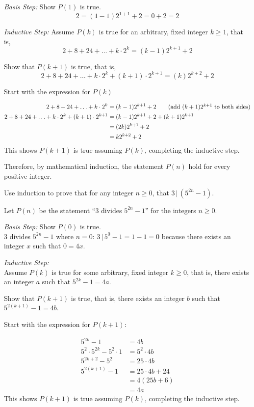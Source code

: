 \begin{questions}
\begin{solution}
  \textit{Basis Step:}  Show $P(1)$ is true.  
  \[ 2 = (1-1)2^{1+1} + 2 = 0 + 2 = 2  \]

  \textit{Inductive Step:}  Assume $P(k)$ is true for an arbitrary, fixed integer $k \geq 1$, that is, 
    \[ 2 + 8 + 24 + \ldots + k\cdot 2^k = (k-1)2^{k+1} + 2 \]

  Show that $P(k+1)$ is true, that is, 
    \[ 2 + 8 + 24 + \ldots + k\cdot 2^k  + (k+1)\cdot 2^{k+1} = (k)2^{k+2} + 2   \]

  Start with the expression for $P(k)$ 

  \begin{align*}
    2 + 8 + 24 + \ldots + k\cdot 2^k &=  (k-1)2^{k+1} + 2 \tag{add $(k+1)2^{k+1}$ to both sides} \\
    2 + 8 + 24 + \ldots + k\cdot 2^k  + (k+1)\cdot 2^{k+1}  &=  (k-1)2^{k+1} + 2 + (k+1)2^{k+1}  \\
     &= (2k)2^{k+1} + 2 \\
     &= k2^{k+2} + 2 
  \end{align*}
  This shows $P(k+1)$ is true assuming $P(k)$, completing the inductive step.

  Therefore, by mathematical induction, the statement $P(n)$ hold for every positive integer.
\end{solution}


\newpage
{} Use induction to prove that for any integer $n \geq 0$, that $3 \,|\, (5^{2n} -1)$.
  
\begin{solution}
  Let $P(n)$ be the statement ``3 divides $5^{2n} - 1$'' for the integers $n \geq 0$. 

  \textit{Basis Step:} Show $P(0)$ is true.  \\
    3 divides $5^{2n} -1$ where $n=0$: $3 \,|\, 5^{0} - 1 = 1 - 1 = 0$ because there exists an integer $x$ such that $0 = 4x$. 

  \textit{Inductive Step:} \\
  Assume $P(k)$ is true for some arbitrary, fixed integer $k \geq 0$, that is, there exists an integer $a$ such that $5^{2k} - 1 = 4a$. 

  Show that $P(k+1)$ is true, that is, there exists an integer $b$ such that $5^{2(k+1)} - 1 = 4b$. 

  Start with the expression for $P(k+1)$: 

  \begin{align*}
    5^{2k} - 1 &= 4b \\
    5^2\cdot 5^{2k} - 5^2\cdot 1 &= 5^2\cdot 4b \\
    5^{2k+2} - 5^2 &= 25\cdot4b \\
    5^{2(k+1)} - 1 &= 25\cdot4b + 24 \\
     &= 4(25b + 6) \\
     &= 4a 
  \end{align*}
  This shows $P(k+1)$ is true assuming $P(k)$, completing the inductive step. 


\end{solution}
\end{questions}
